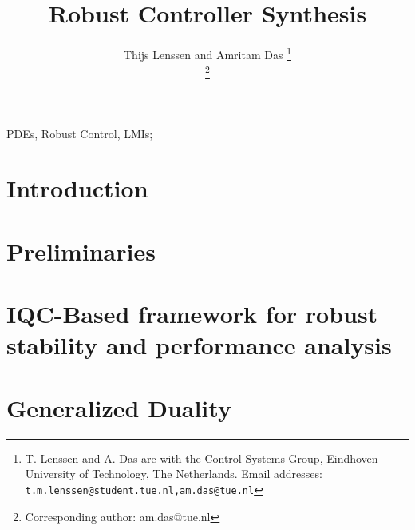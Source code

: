 \documentclass[journal,10pt,doublecolumn,twoside, a4paper]{IEEEtran}
\begin{document}
\title{Robust Controller Synthesis}

\author{Thijs Lenssen and Amritam Das%
	\thanks{T. Lenssen and A. Das are with the Control Systems Group, Eindhoven University of Technology, The Netherlands. Email addresses: \small{\tt\small{t.m.lenssen@student.tue.nl,am.das@tue.nl}}}

	\thanks{Corresponding author: am.das@tue.nl}}%

\maketitle

\begin{abstract}

\end{abstract}

\begin{IEEEkeywords}
	PDEs, Robust Control, LMIs;
\end{IEEEkeywords}

\section{Introduction}

\section{Preliminaries}


\section{IQC-Based framework for robust stability and performance analysis}


\section{Generalized Duality}\label{sec:genduality}

\end{document}
